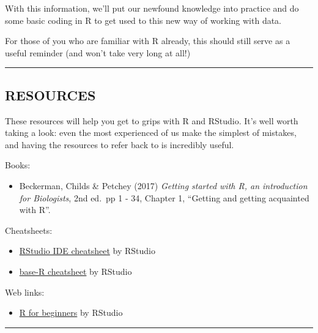 \documentclass[
]{book}
\providecommand{\tightlist}{%
  \setlength{\itemsep}{0pt}\setlength{\parskip}{0pt}}
\begin{document}
With this information, we'll put our newfound knowledge into practice and
do some basic coding in R to get used to this new way of working with data.

For those of you who are familiar with R already, this should still serve as a
useful reminder (and won't take very long at all!)\\
\hspace*{0.333em}

\begin{center}\rule{0.5\linewidth}{0.5pt}\end{center}

\hypertarget{resources}{%
\subsection{RESOURCES}\label{resources}}

These resources will help you get to grips with R and RStudio. It's well worth
taking a look: even the most experienced of us make the simplest of mistakes,
and having the resources to refer back to is incredibly useful.

Books:

\begin{itemize}
\tightlist
\item
  Beckerman, Childs \& Petchey (2017) \emph{Getting started with R, an
  introduction for Biologists}, 2nd ed.~pp 1 - 34, Chapter 1, ``Getting and
  getting acquainted with R''.
  ~
\end{itemize}

Cheatsheets:

\begin{itemize}
\tightlist
\item
  \href{https://github.com/rstudio/cheatsheets/raw/master/rstudio-ide.pdf}{RStudio IDE cheatsheet} by RStudio
\item
  \href{http://github.com/rstudio/cheatsheets/raw/master/base-r.pdf}{base-R cheatsheet} by RStudio
  ~
\end{itemize}

Web links:

\begin{itemize}
\tightlist
\item
  \href{https://education.rstudio.com/learn/beginner}{R for beginners} by RStudio\\
  \hspace*{0.333em}
\end{itemize}

\begin{center}\rule{0.5\linewidth}{0.5pt}\end{center}
\end{document}
